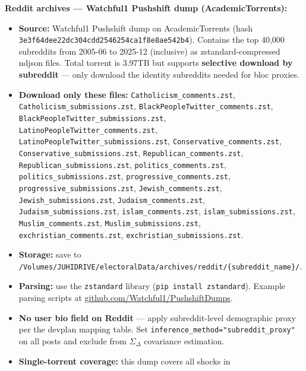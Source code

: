 \documentclass[11pt]{article}
\begin{document}
\begin{taskbox}
{  \smallskip
  \textbf{Reddit archives --- Watchful1 Pushshift dump (AcademicTorrents):}
  \begin{itemize}[leftmargin=1.6em, itemsep=1pt]
    \item \textbf{Source:} Watchful1 Pushshift dump on AcademicTorrents
          (hash \texttt{3e3f64dee22dc304cdd2546254ca1f8e8ae542b4}).
          Contains the top 40,000 subreddits from 2005-06 to 2025-12 (inclusive) as
          zstandard-compressed ndjson files. Total torrent is 3.97TB but
          supports \textbf{selective download by subreddit} --- only
          download the identity subreddits needed for bloc proxies.
    \item \textbf{Download only these files:}
          \texttt{Catholicism\_comments.zst},
          \texttt{Catholicism\_submissions.zst},
          \texttt{BlackPeopleTwitter\_comments.zst},
          \texttt{BlackPeopleTwitter\_submissions.zst},
          \texttt{LatinoPeopleTwitter\_comments.zst},
          \texttt{LatinoPeopleTwitter\_submissions.zst},
          \texttt{Conservative\_comments.zst},
          \texttt{Conservative\_submissions.zst},
          \texttt{Republican\_comments.zst},
          \texttt{Republican\_submissions.zst},
          \texttt{politics\_comments.zst},
          \texttt{politics\_submissions.zst},
          \texttt{progressive\_comments.zst},
          \texttt{progressive\_submissions.zst},
          \texttt{Jewish\_comments.zst},
          \texttt{Jewish\_submissions.zst},
          \texttt{Judaism\_comments.zst},
          \texttt{Judaism\_submissions.zst},
          \texttt{islam\_comments.zst},
          \texttt{islam\_submissions.zst},
          \texttt{Muslim\_comments.zst},
          \texttt{Muslim\_submissions.zst},
          \texttt{exchristian\_comments.zst},
          \texttt{exchristian\_submissions.zst}.
    \item \textbf{Storage:} save to
          \texttt{/Volumes/JUHIDRIVE/electoralData/archives/reddit/\{subreddit\_name\}/}.
    \item \textbf{Parsing:} use the \texttt{zstandard} library
          (\texttt{pip install zstandard}). Example parsing scripts at
          \url{github.com/Watchful1/PushshiftDumps}.
    \item \textbf{No user bio field on Reddit} --- apply subreddit-level
          demographic proxy per the devplan mapping table.
          Set \texttt{inference\_method="subreddit\_proxy"} on all posts
          and exclude from $\Sigma_\Delta$ covariance estimation.
    \item \textbf{Single-torrent coverage:} this dump covers all shocks in

\end{itemize}}
\end{taskbox}
\end{document}
